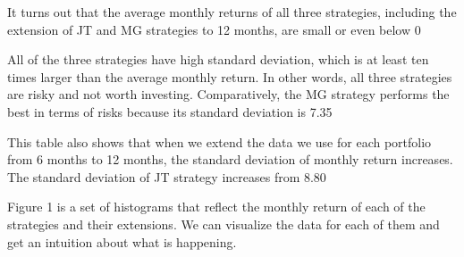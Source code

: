 \documentclass{article}
\begin{document}
It turns out that the average monthly returns of all three strategies, including the extension of JT and MG strategies to 12 months, are small or even below 0%

All of the three strategies have high standard deviation, which is at least ten times larger than the average monthly return. In other words, all three strategies are risky and not worth investing. Comparatively, the MG strategy performs the best in terms of risks because its standard deviation is 7.35%

This table also shows that when we extend the data we use for each portfolio from 6 months to 12 months, the standard deviation of monthly return increases. The standard deviation of JT strategy increases from 8.80%

Figure 1 is a set of histograms that reflect the monthly return of each of the strategies and their extensions. We can visualize the data for each of them and get an intuition about what is happening.
\end{document}
